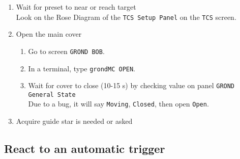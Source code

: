 \documentclass[11pt,fleqn]{book} %
\begin{document}
\begin{enumerate}
\begin{enumerate}
    \item Wait for preset to near or reach target\\
          Look on the Rose Diagram of the \texttt{TCS Setup Panel} on the \texttt{TCS} screen.
    \item Open the main cover
    \begin{enumerate}
      \item Go to screen \texttt{GROND BOB}.
      \item In a terminal, type \texttt{grondMC OPEN}.
      \item Wait for cover to close (10-15 s) by checking value on panel \texttt{GROND General State}\\
            Due to a bug, it will say \texttt{Moving}, \texttt{Closed}, then open \texttt{Open}. 
    \end{enumerate}
    \item Acquire guide star is needed or asked
  \end{enumerate}
\end{enumerate}


\subsection{React to an automatic trigger}
\end{document}
